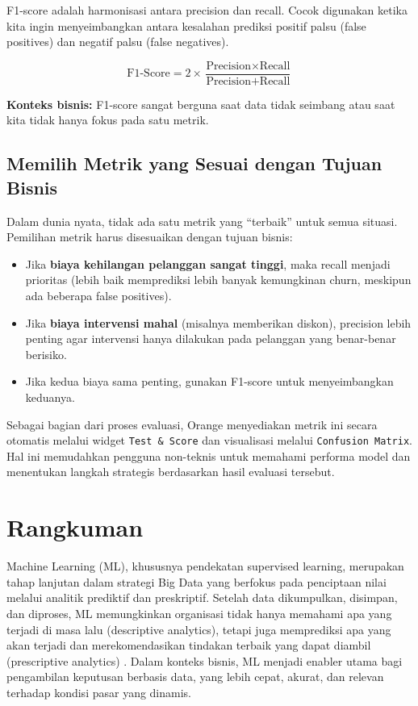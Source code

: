 F1-score adalah harmonisasi antara precision dan recall. Cocok digunakan ketika kita ingin menyeimbangkan antara kesalahan prediksi positif palsu (false positives) dan negatif palsu (false negatives).

\[
\text{F1-Score} = 2 \times \frac{\text{Precision} \times \text{Recall}}{\text{Precision} + \text{Recall}}
\]

\textbf{Konteks bisnis:} F1-score sangat berguna saat data tidak seimbang atau saat kita tidak hanya fokus pada satu metrik.

\subsection*{Memilih Metrik yang Sesuai dengan Tujuan Bisnis}

Dalam dunia nyata, tidak ada satu metrik yang “terbaik” untuk semua situasi. Pemilihan metrik harus disesuaikan dengan tujuan bisnis:

\begin{itemize}
	\item Jika \textbf{biaya kehilangan pelanggan sangat tinggi}, maka recall menjadi prioritas (lebih baik memprediksi lebih banyak kemungkinan churn, meskipun ada beberapa false positives).
	\item Jika \textbf{biaya intervensi mahal} (misalnya memberikan diskon), precision lebih penting agar intervensi hanya dilakukan pada pelanggan yang benar-benar berisiko.
	\item Jika kedua biaya sama penting, gunakan F1-score untuk menyeimbangkan keduanya.
\end{itemize}

Sebagai bagian dari proses evaluasi, Orange menyediakan metrik ini secara otomatis melalui widget \texttt{Test \& Score} dan visualisasi melalui \texttt{Confusion Matrix}. Hal ini memudahkan pengguna non-teknis untuk memahami performa model dan menentukan langkah strategis berdasarkan hasil evaluasi tersebut.




\section{Rangkuman}

Machine Learning (ML), khususnya pendekatan supervised learning, merupakan tahap lanjutan dalam strategi Big Data yang berfokus pada penciptaan nilai melalui analitik prediktif dan preskriptif. Setelah data dikumpulkan, disimpan, dan diproses, ML memungkinkan organisasi tidak hanya memahami apa yang terjadi di masa lalu (descriptive analytics), tetapi juga memprediksi apa yang akan terjadi dan merekomendasikan tindakan terbaik yang dapat diambil (prescriptive analytics) \cite{provost2013data}. Dalam konteks bisnis, ML menjadi enabler utama bagi pengambilan keputusan berbasis data, yang lebih cepat, akurat, dan relevan terhadap kondisi pasar yang dinamis.

